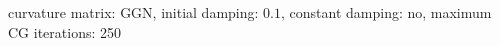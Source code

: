 curvature matrix: GGN, initial damping: $\num[scientific-notation=true]{0.1}$, constant damping: no, maximum CG iterations: 250